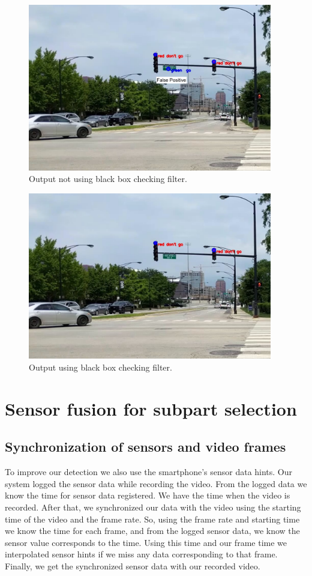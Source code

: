 \begin{figure}[!ht]
\centering
\includegraphics[width=4.2in]{images/norec_filter.pdf}
\caption{Output not using black box checking filter.}
\label{f:norec_filter}
\end{figure}



\begin{figure}[ht!]
\centering
\includegraphics[width=4.2in]{images/rec_filter.pdf}
\caption{Output using black box checking filter.}
\label{f:rec_filter}
\end{figure}




\section{Sensor fusion for subpart selection}

\subsection{Synchronization of sensors and video frames}
To improve our detection we also use the smartphone's sensor data hints.
Our system logged the sensor data while recording the video.
From the logged data we know the time for sensor data registered.
We have the time when the video is recorded.
After that, we synchronized our data with the video using the starting time of the video and the frame rate.
So, using the frame rate and starting time we know the time for each frame, and from the logged sensor data, we know the sensor value corresponds to the time.
Using this time and our frame time we interpolated sensor hints if we miss any data corresponding to that frame.
Finally, we get the synchronized sensor data with our recorded video.

